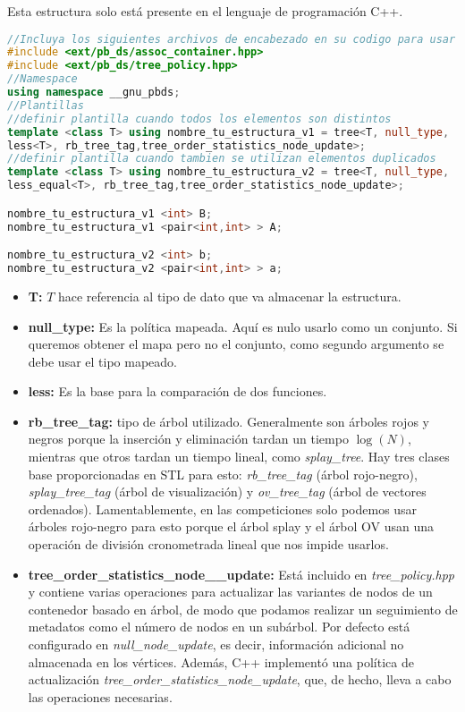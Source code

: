 Esta estructura solo está presente en el lenguaje de programación C++.

\begin{lstlisting}[language=C++]
//Incluya los siguientes archivos de encabezado en su codigo para usar PBDS:
#include <ext/pb_ds/assoc_container.hpp>
#include <ext/pb_ds/tree_policy.hpp>
//Namespace 
using namespace __gnu_pbds;
//Plantillas
//definir plantilla cuando todos los elementos son distintos 
template <class T> using nombre_tu_estructura_v1 = tree<T, null_type,
less<T>, rb_tree_tag,tree_order_statistics_node_update>;
//definir plantilla cuando tambien se utilizan elementos duplicados
template <class T> using nombre_tu_estructura_v2 = tree<T, null_type,
less_equal<T>, rb_tree_tag,tree_order_statistics_node_update>;

nombre_tu_estructura_v1 <int> B;
nombre_tu_estructura_v1 <pair<int,int> > A;

nombre_tu_estructura_v2 <int> b;
nombre_tu_estructura_v2 <pair<int,int> > a;
\end{lstlisting} 

\begin{itemize}
	\item \textbf{T:} $T$ hace referencia al tipo de dato que va almacenar la estructura.
	
	\item \textbf{null\_type:} Es la política mapeada. Aquí es nulo usarlo como un conjunto. Si queremos obtener el mapa pero no el conjunto, como segundo argumento se debe usar el tipo mapeado.
	
	\item \textbf{less:} Es la base para la comparación de dos funciones.
	
	\item \textbf{rb\_tree\_tag:} tipo de árbol utilizado. Generalmente son árboles rojos y negros porque la inserción y eliminación tardan un tiempo $\log(N)$, mientras que otros tardan un tiempo lineal, como \emph{splay\_tree}. Hay tres clases base proporcionadas en STL para esto: \emph{rb\_tree\_tag} (árbol rojo-negro), \emph{splay\_tree\_tag} (árbol de visualización) y \emph{ov\_tree\_tag} (árbol de vectores ordenados). Lamentablemente, en las competiciones solo podemos usar árboles rojo-negro para esto porque el árbol splay y el árbol OV usan una operación de división cronometrada lineal que nos impide usarlos.
	
	\item \textbf{tree\_order\_statistics\_node\_\_update:} Está incluido en \emph{tree\_policy.hpp} y contiene varias operaciones para actualizar las variantes de nodos de un contenedor basado en árbol, de modo que podamos realizar un seguimiento de metadatos como el número de nodos en un subárbol. Por defecto está configurado en \emph{null\_node\_update}, es decir, información adicional no almacenada en los vértices. Además, C++ implementó una política de actualización \emph{tree\_order\_statistics\_node\_update}, que, de hecho, lleva a cabo las operaciones necesarias.
\end{itemize}

